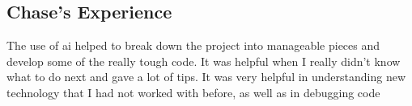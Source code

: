 \subsection{Chase's Experience}
The use of ai helped to break down the project into manageable pieces and develop some of the really tough code. It was helpful when I really didn’t know what to do next and gave a lot of tips. It was very helpful in understanding new technology that I had not worked with before, as well as in debugging code